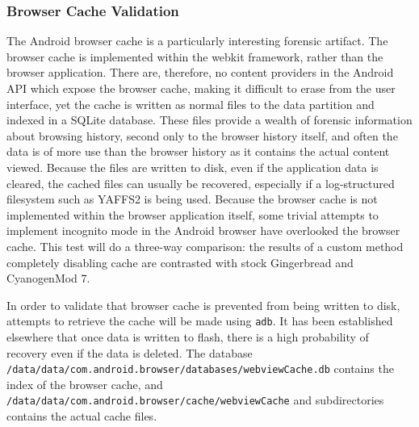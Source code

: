 \subsubsection{Browser Cache Validation}
The Android browser cache is a particularly interesting forensic artifact.  The browser cache is implemented within the webkit
framework, rather than the browser application.  There are, therefore, no content providers in the Android API which expose the
browser cache, making it difficult to erase from the user interface, yet the cache is written as normal files to the data partition
and indexed in a SQLite database.  These files provide a wealth of forensic information about browsing history, second only to the
browser history itself, and often the data is of more use than the browser history as it contains the actual content viewed.
Because the files are written to disk, even if the application data is cleared, the cached files can usually be recovered,
especially if a log-structured filesystem such as YAFFS2 is being used.  Because the browser cache is not implemented within the
browser application itself, some trivial attempts to implement incognito mode in the Android browser have overlooked the browser
cache.  This test will do a three-way comparison: the results of a custom method completely disabling cache are contrasted with
stock Gingerbread and CyanogenMod 7.

In order to validate that browser cache is prevented from being written to disk, attempts to retrieve the cache will be made using
\texttt{adb}.  It has been established elsewhere that once data is written to flash, there is a high probability of recovery even if
the data is deleted. The database \texttt{/data/data/com.android.browser/databases/webviewCache.db} contains the index of the
browser cache, and \texttt{/data/data/com.android.browser/cache/webviewCache} and subdirectories contains the actual cache files. 

